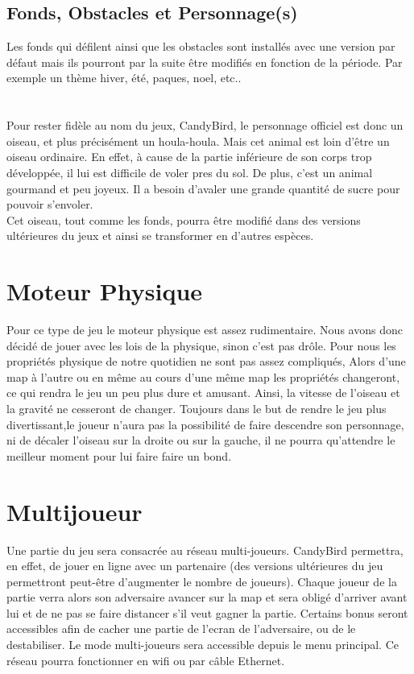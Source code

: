 \documentclass [11pt]{report}
\begin{document}
		\subsection {Fonds, Obstacles et Personnage(s)}
	 		Les fonds qui défilent ainsi que les obstacles sont installés avec une version par défaut mais ils pourront par la suite être modifiés en fonction de la période. Par exemple un thème hiver, été, paques, noel, etc..\\\\\\
 			\indent Pour rester fidèle au nom du jeux, CandyBird, le personnage officiel est donc un oiseau, et plus précisément un houla-houla.
Mais cet animal est loin d'être un oiseau ordinaire. En effet, à cause de la partie inférieure de son corps trop développée, il lui est difficile de voler pres du sol. De plus, c'est un animal gourmand et peu joyeux. Il a besoin d'avaler une grande quantité de sucre pour pouvoir s'envoler.\\
			\indent Cet oiseau, tout comme les fonds, pourra être modifié dans des versions ultérieures du jeux et ainsi se transformer en d'autres espèces.\\\vspace{5mm}



	\section {Moteur Physique}
			Pour ce type de jeu le moteur physique est assez rudimentaire. Nous avons donc décidé de jouer avec les lois de la physique, sinon c'est pas drôle. Pour nous les propriétés physique de notre quotidien ne sont pas assez compliqués, Alors d'une map à l'autre ou en même au cours d'une même map les propriétés 				changeront, ce qui rendra le jeu un peu plus dure et amusant. Ainsi, la vitesse de l'oiseau et la gravité ne cesseront de changer. Toujours dans le but de rendre le jeu plus divertissant,le joueur n'aura pas la possibilité de faire descendre son personnage, ni de décaler l'oiseau sur la droite ou sur la gauche, il ne pourra qu'attendre le meilleur 	moment pour lui faire faire un bond.\\\vspace{2mm}


\section {Multijoueur}
		Une partie du jeu sera consacrée au réseau multi-joueurs. CandyBird permettra, en effet, de jouer en ligne avec un partenaire (des versions ultérieures du jeu permettront peut-être d'augmenter le nombre de joueurs). Chaque joueur de la partie verra alors son adversaire avancer sur la map et sera obligé d'arriver avant lui et de ne pas se faire distancer s’il veut gagner la partie. Certains bonus seront accessibles afin de cacher une partie de l'ecran de l'adversaire, ou de le destabiliser. Le mode multi-joueurs sera accessible depuis le menu principal. Ce réseau pourra fonctionner en wifi ou par câble Ethernet. \\ \vspace{5mm}
\end{document}
